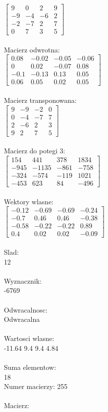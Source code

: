 \documentclass[a4paper,12pt]{article}
\begin{document}
$\begin{bmatrix} 9&0&2&9\\-9&-4&-6&2\\-2&-7&2&7\\0&7&3&5 \end{bmatrix}$
\\
\\
Macierz odwrotna:\\

$\begin{bmatrix} 0.08&-0.02&-0.05&-0.06\\0&0.02&-0.07&0.08\\-0.1&-0.13&0.13&0.05\\0.06&0.05&0.02&0.05 \end{bmatrix}$
\\
\\
Macierz transponowana:\\

$\begin{bmatrix} 9&-9&-2&0\\0&-4&-7&7\\2&-6&2&3\\9&2&7&5 \end{bmatrix}$
\\
\\
Macierz do potegi 3:\\

$\begin{bmatrix} 154&441&378&1834\\-945&-1135&-861&-758\\-324&-574&-119&1021\\-453&623&84&-496 \end{bmatrix}$
\\
\\
Wektory wlasne:\\

$\begin{bmatrix} -0.12&-0.69&-0.69&-0.24\\-0.7&0.46&0.46&-0.38\\-0.58&-0.22&-0.22&0.89\\0.4&0.02&0.02&-0.09 \end{bmatrix}$
\\
\\
Slad:\\
12
\\
\\
Wyznacznik:\\
-6769
\\
\\
Odwracalnosc:\\
Odwracalna
\\
\\
Wartosci wlasne:\\
-11.64 9.4 9.4 4.84
\\
\\
Suma elementow:\\
18
\\
\newpage
Numer macierzy:
255
\\
\\
Macierz:\\
\end{document}
